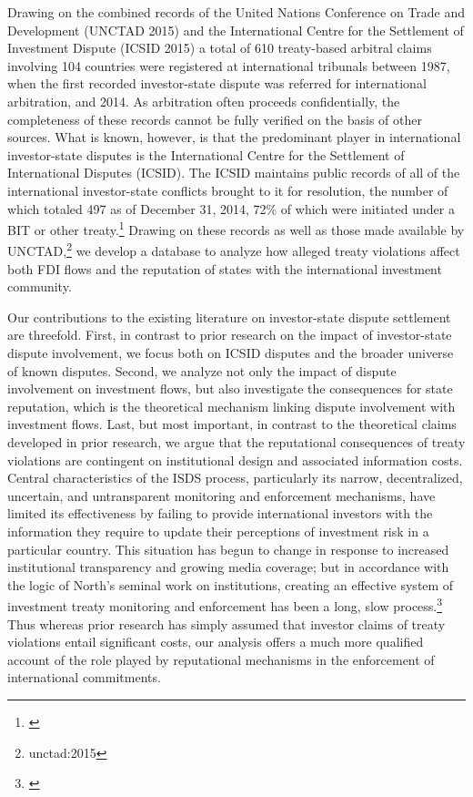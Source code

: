 \documentclass[12pt,onesided]{amsart}
\begin{document}
Drawing on the combined records of the United Nations Conference on Trade and Development (UNCTAD 2015) and the International Centre for the Settlement of Investment Dispute (ICSID 2015) a total of 610 treaty-based arbitral claims involving 104 countries were registered at international tribunals between 1987, when the first recorded investor-state dispute was referred for international arbitration, and 2014. As arbitration often proceeds confidentially, the completeness of these records cannot be fully verified on the basis of other sources. What is known, however, is that the predominant player in international investor-state disputes is the International Centre for the Settlement of International Disputes (ICSID). The ICSID maintains public records of all of the international investor-state conflicts brought to it for resolution, the number of which totaled 497 as of December 31, 2014, 72\% of which were initiated under a BIT or other treaty.\footnote{\citet[p. 7, 10]{icsid:2015}} Drawing on these records as well as those made available by UNCTAD,\footnote{unctad:2015} we develop a database to analyze how alleged treaty violations affect both FDI flows and the reputation of states with the international investment community. 

Our contributions to the existing literature on investor-state dispute settlement are threefold. First, in contrast to prior research on the impact of investor-state dispute involvement, we focus both on ICSID disputes and the broader universe of known disputes. Second, we analyze not only the impact of dispute involvement on investment flows, but also investigate the consequences for state reputation, which is the theoretical mechanism linking dispute involvement with investment flows. Last, but most important, in contrast to the theoretical claims developed in prior research, we argue that the reputational consequences of treaty violations are contingent on institutional design and associated information costs. Central characteristics of the ISDS process, particularly its narrow, decentralized, uncertain, and untransparent monitoring and enforcement mechanisms, have limited its effectiveness by failing to provide international investors with the information they require to update their perceptions of investment risk in a particular country. This situation has begun to change in response to increased institutional transparency and growing media coverage; but in accordance with the logic of North's seminal work on institutions, creating an effective system of investment treaty monitoring and enforcement has been a long, slow process.\footnote{\citet[p. 60]{north1990institutions}} Thus whereas prior research has simply assumed that investor claims of treaty violations entail significant costs, our analysis offers a much more qualified account of the role played by reputational mechanisms in the enforcement of international commitments.
\end{document}
